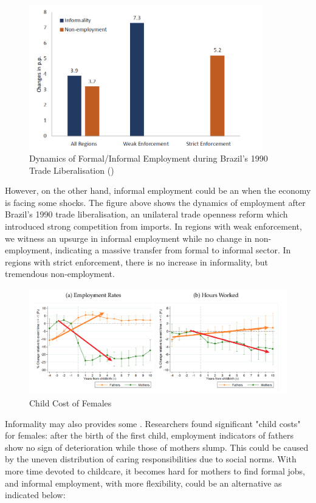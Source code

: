             \begin{figure}[H]
                \centering
                \includegraphics[width=4in]{images/ch6/employment brazil 1990 lib.png}
                \caption{Dynamics of Formal/Informal Employment during Brazil's 1990 Trade Liberalisation (\cite{ponczek_enforcement_2022})}
            \end{figure}
            However, on the other hand, informal employment could be an  when the economy is facing some shocks. The figure above shows the dynamics of employment after Brazil's 1990 trade liberalisation, an unilateral trade openness reform which introduced strong competition from imports. In regions with weak enforcement, we witness an upsurge in informal employment while no change in non-employment, indicating a massive transfer from formal to informal sector. In regions with strict enforcement, there is no increase in informality, but tremendous non-employment.
            \begin{figure}[H]
                \centering
                \includegraphics[width=5.5in]{images/ch6/child cost of females.png}
                \caption{Child Cost of Females}
            \end{figure}
            Informality may also provides some . Researchers found significant "child costs" for females: after the birth of the first child, employment indicators of fathers show no sign of deterioration while those of mothers slump. This could be caused by the uneven distribution of caring responsibilities due to social norms. With more time devoted to childcare, it becomes hard for mothers to find formal jobs, and informal employment, with more flexibility, could be an alternative as indicated below:
